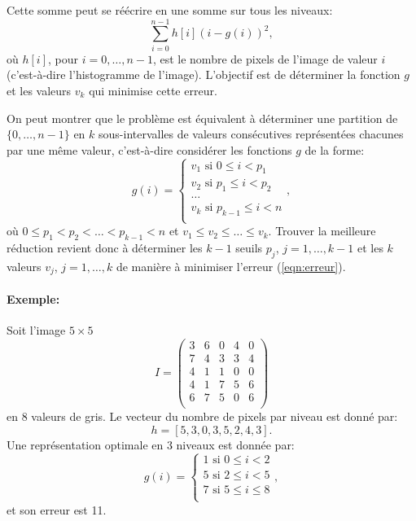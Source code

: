 \documentclass[a4paper,10pt]{article}
\begin{document}
Cette somme peut se réécrire en une somme sur tous les niveaux:
\begin{equation}\label{eqn:erreur}
\sum_{i=0}^{n-1} h[i] (i-g(i))^2,
\end{equation}
où $h[i]$, pour $i=0,\ldots,n-1$, est le nombre de pixels de l'image
de valeur $i$ (c'est-à-dire l'histogramme de l'image). L'objectif est
de déterminer la fonction $g$ et les valeurs $v_k$ qui minimise cette
erreur.

On peut montrer que le problème est équivalent à déterminer une
partition de $\{0,\ldots,n-1\}$ en $k$ sous-intervalles de valeurs
consécutives représentées chacunes par une même valeur, c'est-à-dire
considérer les fonctions $g$ de la forme:
\[
g(i)=\left\{
\begin{array}{ll}
v_1\mbox{ si }0\leq i<p_1\\
v_2\mbox{ si }p_1\leq i < p_2\\
\ldots\\
v_k\mbox{ si }p_{k-1}\leq i< n\\
\end{array}
\right.,
\]
où $0\leq p_1<p_2<\ldots<p_{k-1}<n$ et $v_1\leq v_2\leq\ldots \leq v_k$. Trouver la meilleure réduction revient
donc à déterminer les $k-1$ seuils $p_j$, $j=1,\ldots, k-1$ et les $k$
valeurs $v_j$, $j=1,\ldots,k$ de manière à minimiser l'erreur
(\ref{eqn:erreur}).


\paragraph{Exemple:} Soit l'image $5\times 5$
$$I=\left(\begin{matrix}
     3 & 6 & 0 & 4 & 0\\
     7 & 4 & 3 & 3 & 4\\
     4 & 1 & 1 & 0 & 0\\
     4 & 1 & 7 & 5 & 6\\
     6 & 7 & 5 & 0 & 6\\
\end{matrix}\right)
$$
en 8 valeurs de gris. Le vecteur du nombre de pixels par niveau est donné par:
$$h=[5,3,0,3,5,2,4,3].$$ Une représentation optimale en 3 niveaux est donnée par:
\[g(i)=\left\{
\begin{array}{ll}
1\mbox{ si }0\leq i<2\\
5\mbox{ si }2\leq i < 5\\
7\mbox{ si }5\leq i\leq 8\\
\end{array}
\right.,
\]
et son erreur est 11.
\end{document}
